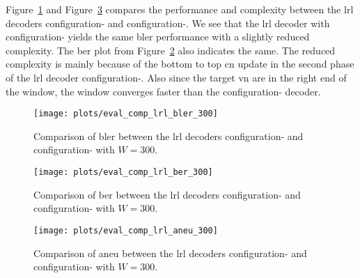 Figure~\ref{fig:eval_comp_lrl_bler_300} and Figure~\ref{fig:eval_comp_lrl_aneu_300} compares the performance and complexity between the \gls{lrl} decoders configuration- and configuration-. We see that the \gls{lrl} decoder with configuration- yields the same \gls{bler} performance with a slightly reduced complexity. The \gls{ber} plot from Figure~\ref{fig:eval_comp_lrl_ber_300} also indicates the same. The reduced complexity is mainly because of the bottom to top \gls{cn} update in the second phase of the \gls{lrl} decoder configuration-. Also since the target \gls{vn} are in the right end of the window, the window converges faster than the configuration- decoder.
\begin{figure}[htbp]
  \centering
  \texttt{[image: plots/eval\_comp\_lrl\_bler\_300]}
  \caption{Comparison of \gls{bler} between the \gls{lrl} decoders configuration- and configuration- with $W=300$.}
  \label{fig:eval_comp_lrl_bler_300}
\end{figure}
\begin{figure}[htbp]
  \centering
  \texttt{[image: plots/eval\_comp\_lrl\_ber\_300]}
  \caption{Comparison of \gls{ber} between the \gls{lrl} decoders configuration- and configuration- with $W=300$.}
  \label{fig:eval_comp_lrl_ber_300}
\end{figure}
\begin{figure}[htbp]
  \centering
  \texttt{[image: plots/eval\_comp\_lrl\_aneu\_300]}
  \caption{Comparison of \gls{aneu} between the \gls{lrl} decoders configuration- and configuration- with $W=300$.}
  \label{fig:eval_comp_lrl_aneu_300}
\end{figure}

